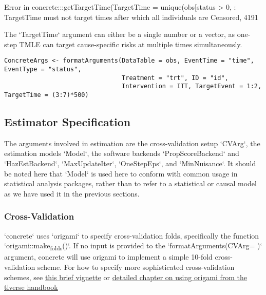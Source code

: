 \documentclass{report}
\newcommand{\1}{\ensuremath{\mathbf{1}}}
\begin{document}
Error in concrete:::getTargetTime(TargetTime = unique(obs[status > 0,  : 
  TargetTime must not target times after which all individuals are Censored, 4191

The `TargetTime` argument can either be a single number or a vector, as one-step TMLE can target cause-specific risks at multiple times simultaneously.

\begin{lstlisting}
ConcreteArgs <- formatArguments(DataTable = obs, EventTime = "time", EventType = "status", 
                                Treatment = "trt", ID = "id", 
                                Intervention = ITT, TargetEvent = 1:2, TargetTime = (3:7)*500)
\end{lstlisting}

\subsection{Estimator Specification}
\label{sec:orgb43ffe4}
The arguments involved in estimation are the cross-validation setup `CVArg`, the estimation models `Model`, the software backends `PropScoreBackend` and `HazEstBackend`, `MaxUpdateIter`, `OneStepEps`, and `MinNuisance`. It should be noted here that `Model` is used here to conform with common usage in statistical analysis packages, rather than to refer to a statistical or causal model as we have used it in the previous sections. 

\subsubsection{Cross-Validation}
\label{sec:org4e42745}

`concrete` uses `origami` to specify cross-validation folds, specifically the function `origami::make\textsubscript{folds}()`. If no input is provided to the `formatArguments(CVArg= )` argument, concrete will use origami to implement a simple 10-fold cross-validation scheme. For how to specify more sophisticated cross-validation schemes, see \href{https://tlverse.org/origami/articles/generalizedCV.html}{this brief vignette} or \href{https://tlverse.org/tlverse-handbook/origami.html}{detailed chapter on using origami from the tlverse handbook}
\end{document}
